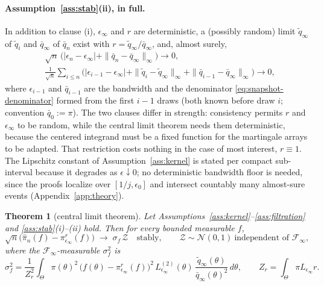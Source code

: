 \documentclass[pdflatex,sn-mathphys-num]{sn-jnl}
\theoremstyle{plain}
\newtheorem{theorem}{Theorem}
\theoremstyle{definition}
\begin{document}
\begin{appendices}
\paragraph{Assumption~\ref{ass:stab}(ii), in full.} In addition to clause (i), $\epsilon_\infty$ and $r$ are deterministic, a (possibly random) limit $\tilde q_\infty$ of $\tilde q_i$ and $\bar q_\infty$ of $\bar q_n$ exist with $r=\tilde q_\infty/\bar q_\infty$, and, almost surely,
\begin{equation}
\begin{aligned}
&\sqrt n\,\bigl(|\epsilon_n-\epsilon_\infty|+\|\bar q_n-\bar q_\infty\|_\infty\bigr)\to0,\\
&\tfrac{1}{\sqrt n}\textstyle\sum_{i\le n}\bigl(|\epsilon_{i-1}-\epsilon_\infty|+\|\tilde q_i-\tilde q_\infty\|_\infty+\|\bar q_{i-1}-\bar q_\infty\|_\infty\bigr)\to0,
\end{aligned}
\label{eq:rate}
\end{equation}
where $\epsilon_{i-1}$ and $\bar q_{i-1}$ are the bandwidth and the denominator \eqref{eq:snapshot-denominator} formed from the first $i-1$ draws (both known before draw $i$; convention $\bar q_0:=\pi$). The two clauses differ in strength: consistency permits $r$ and $\epsilon_\infty$ to be random, while the central limit theorem needs them deterministic, because the centered integrand must be a fixed function for the martingale arrays to be adapted. That restriction costs nothing in the case of most interest, $r\equiv1$. The Lipschitz constant of Assumption~\ref{ass:kernel} is stated per compact sub-interval because it degrades as $\epsilon\downarrow0$; no deterministic bandwidth floor is needed, since the proofs localize over $[1/j,\epsilon_0]$ and intersect countably many almost-sure events (Appendix~\ref{app:theory}).

\begin{theorem}[central limit theorem]\label{thm:clt}
Let Assumptions~\ref{ass:kernel}--\ref{ass:filtration} and \ref{ass:stab}(i)--(ii) hold. Then for every bounded measurable $f$,
\begin{equation}
\sqrt{n}\bigl(\widehat\pi_n(f)-\pi^r_{\epsilon_\infty}(f)\bigr)\;\longrightarrow\;\sigma_f\,\mathcal{Z}
\quad\text{stably},\qquad \mathcal{Z}\sim\mathcal{N}(0,1)\ \text{independent of }\mathcal{F}_\infty,
\label{eq:clt-conv}
\end{equation}
where the $\mathcal{F}_\infty$-measurable $\sigma^2_f$ is
\begin{equation}
\sigma_f^2=\frac{1}{Z_r^{2}}\int_\Theta \pi(\theta)^2\,\bigl(f(\theta)-\pi^r_{\epsilon_\infty}(f)\bigr)^2\,L^{(2)}_{\epsilon_\infty}(\theta)\,\frac{\tilde q_\infty(\theta)}{\bar q_\infty(\theta)^2}\,d\theta,
\qquad Z_r=\int_\Theta\pi L_{\epsilon_\infty}r .
\label{eq:clt-variance}
\end{equation}
\end{theorem}


\end{appendices}
\end{document}
